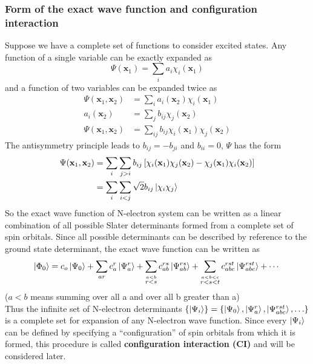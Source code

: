 \documentclass[11pt]{article}
\begin{document}
\subsubsection{Form of the exact wave function and configuration interaction}
Suppose we have a complete set of functions to consider excited states. Any function of a single variable
can be exactly expanded as
\begin{equation}
    \Psi(\mathbf{x}_1)=\sum_{i}a_i\chi_i(\mathbf{x}_1)
\end{equation}
and a function of two variables can be expanded twice as
\begin{align}
    \Psi(\mathbf{x}_1,\mathbf{x}_2)&=\sum_{i}a_i(\mathbf{x}_2)\chi_i(\mathbf{x}_1)\\
    a_i(\mathbf{x}_2)&=\sum_{j}b_{ij}\chi_j(\mathbf{x}_2)\\
    \Psi(\mathbf{x}_1,\mathbf{x}_2)&=\sum_{ij}b_{ij}\chi_i(\mathbf{x}_1)\chi_j(\mathbf{x}_2)
\end{align}
The antisymmetry principle leads to $b_{ij}=-b_{ji}$ and $b_{ii}=0$, $\Psi$ has the form
\begin{equation}
    \begin{split}
        \Psi(\mathbf{x}_1,\mathbf{x}_2)&=\sum_{i}\sum_{j>i}b_{ij}\left[\chi_i(\mathbf{x}_1)\chi_j(\mathbf{x}_2)
    -\chi_j(\mathbf{x}_1)\chi_i(\mathbf{x}_2)\right]\\
    &=\sum_{i}\sum_{i<j}\sqrt{2}b_{ij}\ket{\chi_i\chi_j}
    \end{split}
\end{equation}
So the exact wave function of N-electron system can be written as a linear combination of
all possible Slater determinants formed from a complete set of spin orbitals. Since all possible
determinants can be described by reference to the ground state determinant, the exact wave function
can be written as
\begin{equation}
    \ket{\Phi_0}=c_o\ket{\Psi_0}+\sum_{ar}c_a^r\ket{\Psi_a^r}+\sum_{\stackrel{a<b}{r<s}}c_{ab}^{rs}\ket{\Psi_{ab}^{rs}}+\sum_{\stackrel{a<b<c}{r<s<t}}c_{abc}^{rst}\ket{\Psi_{abc}^{rst}}+\cdots
\end{equation}
($a<b$ means summing over all a and over all b greater than a)\\
Thus the infinite set of N-electron determinants $\{\ket{\Psi_i}\}=\{\ket{\Psi_0},\ket{\Psi_a^r},\ket{\Psi_{abc}^{rst}},\ldots\}$
is a complete set for expansion of any N-electron wave function. Since every $\ket{\Psi_i}$ can be defined by specifying a “configuration” of
spin orbitals from which it is formed, this procedure is called \textbf{configuration interaction (CI)} and will be considered later.
\end{document}
